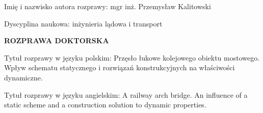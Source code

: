\begin{titlepage}
	\begin{figure}
		\hfill
	\end{figure}
	
	\begin{myfont}
		\vspace*{0cm}
		
		\footnotesize \noindent
		Imię i nazwisko autora rozprawy: mgr inż. Przemysław Kalitowski
		
		\noindent
		Dyscyplina naukowa: inżynieria lądowa i transport
		
		\vspace{3.5cm}
		
		\normalsize \noindent
		\textbf{ROZPRAWA DOKTORSKA}
		
		\vspace{3.5cm}
		
		\footnotesize \noindent%
		Tytuł rozprawy w języku polskim: Przęsło łukowe kolejowego obiektu mostowego. Wpływ \mbox{schematu} statycznego i rozwiązań konstrukcyjnych na właściwości dynamiczne.%
		
		\vspace{0.5cm}
		
		\noindent%
		Tytuł rozprawy w języku angielskim: A railway arch bridge. An influence of a static scheme and a construction solution to dynamic properties.
		
		\vfill
		

\end{myfont}
\end{titlepage}
